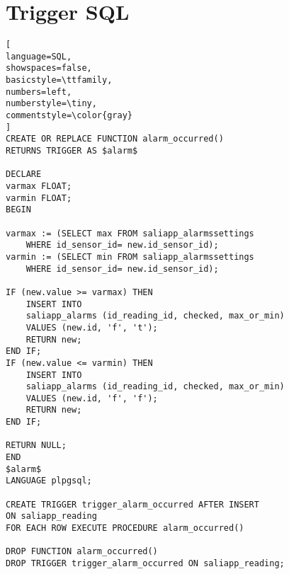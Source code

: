 \chapter{Trigger SQL }


\begin{lstlisting}[
language=SQL,
showspaces=false,
basicstyle=\ttfamily,
numbers=left,
numberstyle=\tiny,
commentstyle=\color{gray}
]
CREATE OR REPLACE FUNCTION alarm_occurred()
RETURNS TRIGGER AS $alarm$

DECLARE
varmax FLOAT;
varmin FLOAT;
BEGIN

varmax := (SELECT max FROM saliapp_alarmssettings 
	WHERE id_sensor_id= new.id_sensor_id);
varmin := (SELECT min FROM saliapp_alarmssettings 
	WHERE id_sensor_id= new.id_sensor_id);

IF (new.value >= varmax) THEN 
	INSERT INTO 
	saliapp_alarms (id_reading_id, checked, max_or_min) 
	VALUES (new.id, 'f', 't');
	RETURN new;
END IF;
IF (new.value <= varmin) THEN 
	INSERT INTO 
	saliapp_alarms (id_reading_id, checked, max_or_min)
	VALUES (new.id, 'f', 'f');
	RETURN new;
END IF;

RETURN NULL;
END
$alarm$
LANGUAGE plpgsql;

CREATE TRIGGER trigger_alarm_occurred AFTER INSERT 
ON saliapp_reading
FOR EACH ROW EXECUTE PROCEDURE alarm_occurred()

DROP FUNCTION alarm_occurred()
DROP TRIGGER trigger_alarm_occurred ON saliapp_reading;

\end{lstlisting}

